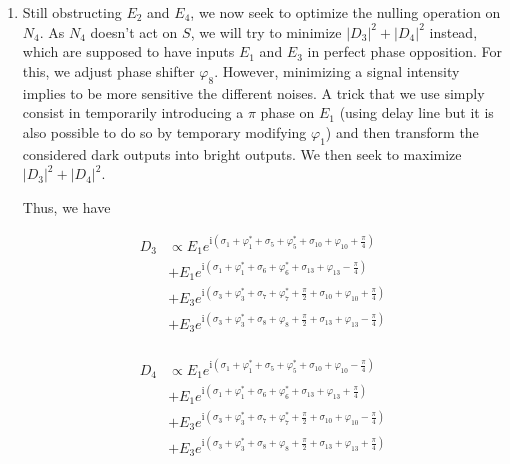 \documentclass{aa}
\newcommand{\mi}{\mathrm{i}}
\begin{document}
\begin{enumerate}
                \item Still obstructing $E_2$ and $E_4$, we now seek to optimize the nulling operation on $N_4$. As $N_4$ doesn't act on $S$, we will try to minimize $|D_3|^2 + |D_4|^2$ instead, which are supposed to have inputs $E_1$ and $E_3$ in perfect phase opposition. For this, we adjust phase shifter $\varphi_8$. However, minimizing a signal intensity implies to be more sensitive the different noises. A trick that we use simply consist in temporarily introducing a $\pi$ phase on $E_1$ (using delay line but it is also possible to do so by temporary modifying $\varphi_1$) and then transform the considered dark outputs into bright outputs. We then seek to maximize $|D_3|^2 + |D_4|^2$.

                    Thus, we have
    
                    \begin{equation}
                    \begin{split}
                    D_3 &\propto E_1 e^{\mi\left(\sigma_1 + \varphi_1^* + \sigma_5 + \varphi_5^* + \sigma_{10} + \varphi_{10} + \frac \pi 4\right)} \\
                        &+ E_1 e^{\mi\left(\sigma_1 + \varphi_1^* + \sigma_6 + \varphi_6^* + \sigma_{13} + \varphi_{13} - \frac \pi 4\right)} \\
                        &+ E_3e^{\mi\left(\sigma_3 + \varphi_3^* + \sigma_7 + \varphi_7^* + \frac \pi 2 + \sigma_{10} + \varphi_{10} + \frac \pi 4\right)}\\
                        &+ E_3e^{\mi\left(\sigma_3 + \varphi_3^* + \sigma_8 + \varphi_8 + \frac \pi 2 + \sigma_{13} + \varphi_{13} - \frac \pi 4\right)}\\
                    \end{split}
                    \end{equation}
    
                    \begin{equation}
                    \begin{split}
                    D_4 &\propto E_1 e^{\mi\left(\sigma_1 + \varphi_1^* + \sigma_5 + \varphi_5^* + \sigma_{10} + \varphi_{10} - \frac \pi 4\right)} \\
                        &+ E_1 e^{\mi\left(\sigma_1 + \varphi_1^* + \sigma_6 + \varphi_6^* + \sigma_{13} + \varphi_{13} + \frac \pi 4\right)} \\
                        &+ E_3e^{\mi\left(\sigma_3 + \varphi_3^* + \sigma_7 + \varphi_7^* + \frac \pi 2 + \sigma_{10} + \varphi_{10} - \frac \pi 4\right)}\\
                        &+ E_3e^{\mi\left(\sigma_3 + \varphi_3^* + \sigma_8 + \varphi_8 + \frac \pi 2 + \sigma_{13} + \varphi_{13} + \frac \pi 4\right)}\\
                    \end{split}
                    \end{equation}
    

\end{enumerate}
\end{document}
